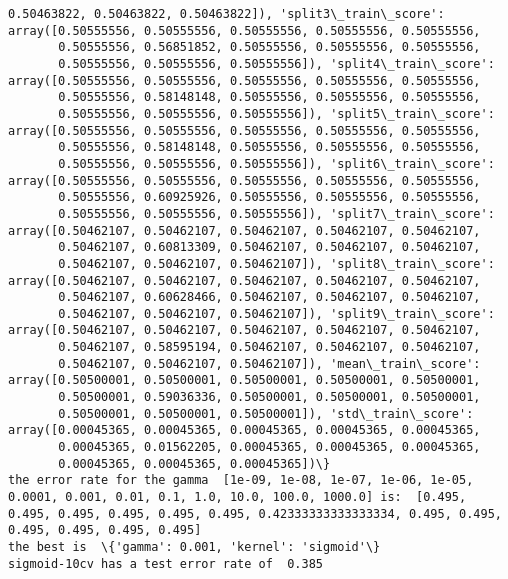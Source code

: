 \documentclass[11pt]{article}
\begin{document}
\begin{Verbatim}[commandchars=\\\{\}]
       0.50463822, 0.50463822, 0.50463822]), 'split3\_train\_score': array([0.50555556, 0.50555556, 0.50555556, 0.50555556, 0.50555556,
       0.50555556, 0.56851852, 0.50555556, 0.50555556, 0.50555556,
       0.50555556, 0.50555556, 0.50555556]), 'split4\_train\_score': array([0.50555556, 0.50555556, 0.50555556, 0.50555556, 0.50555556,
       0.50555556, 0.58148148, 0.50555556, 0.50555556, 0.50555556,
       0.50555556, 0.50555556, 0.50555556]), 'split5\_train\_score': array([0.50555556, 0.50555556, 0.50555556, 0.50555556, 0.50555556,
       0.50555556, 0.58148148, 0.50555556, 0.50555556, 0.50555556,
       0.50555556, 0.50555556, 0.50555556]), 'split6\_train\_score': array([0.50555556, 0.50555556, 0.50555556, 0.50555556, 0.50555556,
       0.50555556, 0.60925926, 0.50555556, 0.50555556, 0.50555556,
       0.50555556, 0.50555556, 0.50555556]), 'split7\_train\_score': array([0.50462107, 0.50462107, 0.50462107, 0.50462107, 0.50462107,
       0.50462107, 0.60813309, 0.50462107, 0.50462107, 0.50462107,
       0.50462107, 0.50462107, 0.50462107]), 'split8\_train\_score': array([0.50462107, 0.50462107, 0.50462107, 0.50462107, 0.50462107,
       0.50462107, 0.60628466, 0.50462107, 0.50462107, 0.50462107,
       0.50462107, 0.50462107, 0.50462107]), 'split9\_train\_score': array([0.50462107, 0.50462107, 0.50462107, 0.50462107, 0.50462107,
       0.50462107, 0.58595194, 0.50462107, 0.50462107, 0.50462107,
       0.50462107, 0.50462107, 0.50462107]), 'mean\_train\_score': array([0.50500001, 0.50500001, 0.50500001, 0.50500001, 0.50500001,
       0.50500001, 0.59036336, 0.50500001, 0.50500001, 0.50500001,
       0.50500001, 0.50500001, 0.50500001]), 'std\_train\_score': array([0.00045365, 0.00045365, 0.00045365, 0.00045365, 0.00045365,
       0.00045365, 0.01562205, 0.00045365, 0.00045365, 0.00045365,
       0.00045365, 0.00045365, 0.00045365])\}
the error rate for the gamma  [1e-09, 1e-08, 1e-07, 1e-06, 1e-05, 0.0001, 0.001, 0.01, 0.1, 1.0, 10.0, 100.0, 1000.0] is:  [0.495, 0.495, 0.495, 0.495, 0.495, 0.495, 0.42333333333333334, 0.495, 0.495, 0.495, 0.495, 0.495, 0.495]
the best is  \{'gamma': 0.001, 'kernel': 'sigmoid'\}
sigmoid-10cv has a test error rate of  0.385

    \end{Verbatim}

    \begin{center}
    \end{center}
    { \hspace*{\fill} \\}
    
\end{document}
